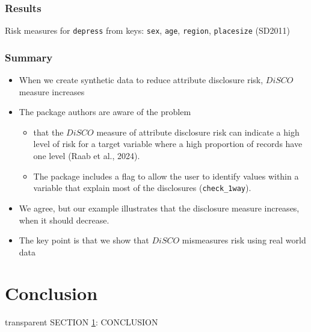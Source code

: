 \documentclass[t,8pt,utfx8]{beamer}
\begin{document}
\begin{spacing}{1.25}
\begin{frame}[t]\frametitle{Results}

\begin{table}[!h]
    \centering
    \caption{Risk measures for \texttt{depress} from keys: \texttt{sex}, \texttt{age}, \texttt{region}, \texttt{placesize} (SD2011)}
    
    \label{tab:attribute_risk_sd2011}
\end{table}



\end{frame}

\begin{frame}[t]\frametitle{Summary}

\begin{itemize}
    \item When we create synthetic data to reduce attribute disclosure risk, $DiSCO$ measure increases

    \item The package authors are aware of the problem 
    \begin{itemize}
        \item  that the $DiSCO$ measure of attribute disclosure risk can indicate a high level of risk for a target variable where a high proportion of records have one level (Raab et al., 2024).
        \item The package includes a flag to allow the user to identify values within a variable that explain most of the disclosures (\texttt{check\_1way}).
    \end{itemize}
    \item We agree, but our example illustrates that the disclosure measure increases, when it should decrease.
    \item The key point is that we show that $DiSCO$ mismeasures risk using real world data
\end{itemize}

\end{frame}


\section{Conclusion}\label{sec:conclusion}
\begin{frame}[c,plain]
\vskip-4mm
\begin{beamercolorbox}[wd=\boxwidth,ht=22.11mm]{transparent}%
    \vfill%
    \leftinsert%
    \MakeUppercase{Section \ref{sec:conclusion}: Conclusion} %
\end{beamercolorbox}
\vskip-3mm
\end{frame}


\end{spacing}
\end{document}
